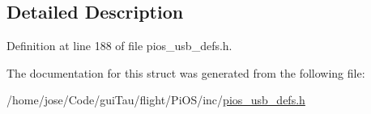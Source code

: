 \subsection{Detailed Description}


Definition at line 188 of file pios\-\_\-usb\-\_\-defs.\-h.



The documentation for this struct was generated from the following file\-:\begin{DoxyCompactItemize}
\item 
/home/jose/\-Code/gui\-Tau/flight/\-Pi\-O\-S/inc/\hyperlink{pios__usb__defs_8h}{pios\-\_\-usb\-\_\-defs.\-h}\end{DoxyCompactItemize}
